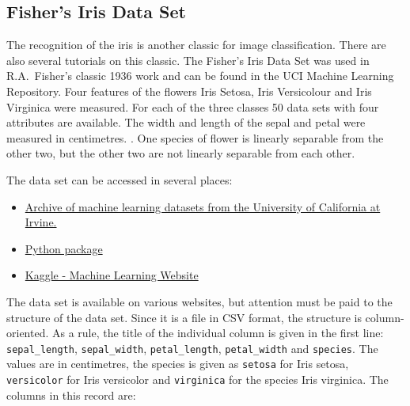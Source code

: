 %
%



\subsection{Fisher's Iris Data Set}

The recognition of the iris is another classic for image classification. There are also several tutorials on this classic. The Fisher's Iris Data Set was used in R.A.~Fisher's classic 1936 work and can be found in the UCI Machine Learning Repository. \cite{Fisher:1936,Iris:2021,Schutten:2016,Unwin:2021} Four features of the flowers Iris Setosa, Iris Versicolour and Iris Virginica were measured. For each of the three classes 50 data sets with four attributes are available. The width and length of the sepal and petal were measured in centimetres. \cite{Anderson:1935,Sahni:2006}. One species of flower is linearly separable from the other two, but the other two are not linearly separable from each other.


The data set can be accessed in several places:

\begin{itemize}
    \item \href{https://archive.ics.uci.edu/ml/datasets/iris}{Archive of machine learning datasets from the University of California at Irvine.} \cite{UCIIris:2021}
    \item \href{https://scikit-learn.org/stable/auto_examples/datasets/plot_iris_dataset.html}{Python package } \cite{scikit-learn:2011}
    \item \href{https://www.kaggle.com/uciml/iris}{Kaggle - Machine Learning Website} \cite{KaggleIris:2018}
\end{itemize}

The data set is available on various websites, but attention must be paid to the structure of the data set. Since it is a file in CSV format, the structure is column-oriented. As a rule, the title of the individual column is given in the first line: \texttt{sepal\_length}, \texttt{sepal\_width}, \texttt{petal\_length}, \texttt{petal\_width} and \texttt{species}. The values are in centimetres, the species is given as \texttt{setosa} for Iris setosa, \texttt{versicolor} for Iris versicolor and \texttt{virginica} for the species Iris virginica.
The columns in this record are:

